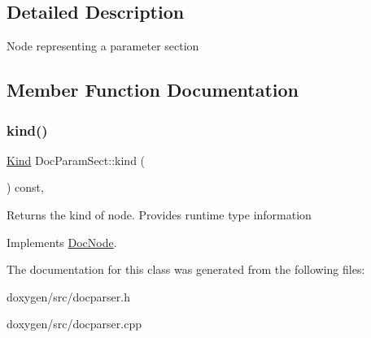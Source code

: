 \subsection{Detailed Description}
Node representing a parameter section 

\subsection{Member Function Documentation}
\mbox{\label{class_doc_param_sect_aa9373d28ee9c50485a28269fa16db197}} 
\subsubsection{\texorpdfstring{kind()}{kind()}}
{\footnotesize\ttfamily \mbox{\hyperlink{class_doc_node_aebd16e89ca590d84cbd40543ea5faadb}{Kind}} Doc\+Param\+Sect\+::kind (\begin{DoxyParamCaption}{ }\end{DoxyParamCaption}) const\hspace{0.3cm}{\ttfamily [inline]}, {\ttfamily [virtual]}}

Returns the kind of node. Provides runtime type information 

Implements \mbox{\hyperlink{class_doc_node_a108ffd214a72ba6e93dac084a8f58049}{Doc\+Node}}.



The documentation for this class was generated from the following files\+:\begin{DoxyCompactItemize}
\item 
doxygen/src/docparser.\+h\item 
doxygen/src/docparser.\+cpp\end{DoxyCompactItemize}

